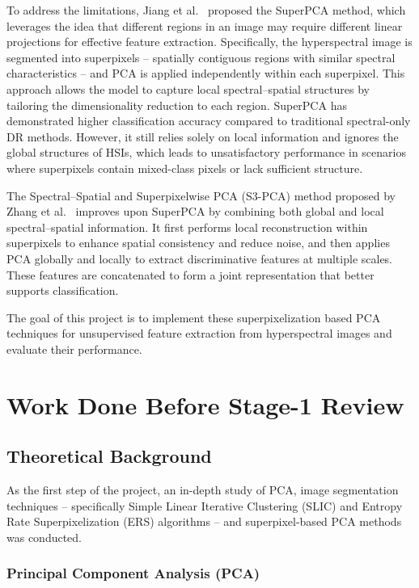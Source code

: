 \documentclass[twoside,english]{article}
\begin{document}
To address the limitations, Jiang et al.\ \citep{SuperPCA} proposed the SuperPCA method, which leverages the idea that different regions in an image may require different linear projections for effective feature extraction. Specifically, the hyperspectral image is segmented into superpixels -- spatially contiguous regions with similar spectral characteristics -- and PCA is applied independently within each superpixel. This approach allows the model to capture local spectral--spatial structures by tailoring the dimensionality reduction to each region. SuperPCA has demonstrated higher classification accuracy compared to traditional spectral-only DR methods. However, it still relies solely on local information and ignores the global structures of HSIs, which leads to unsatisfactory performance in scenarios where superpixels contain mixed-class pixels or lack sufficient structure.


The Spectral–Spatial and Superpixelwise PCA (S3-PCA) method proposed by Zhang et al.\ \citep{S3PCA} improves upon SuperPCA by combining both global and local spectral–spatial information. It first performs local reconstruction within superpixels to enhance spatial consistency and reduce noise, and then applies PCA globally and locally to extract discriminative features at multiple scales. These features are concatenated to form a joint representation that better supports classification.

The goal of this project is to implement these superpixelization based PCA techniques for unsupervised feature extraction from hyperspectral images and evaluate their performance.



\section{Work Done Before Stage-1 Review} \label{sec:stage1}

\subsection{Theoretical Background}
  
As the first step of the project, an in-depth study of PCA, image segmentation techniques -- specifically Simple Linear Iterative Clustering (SLIC) \citep{SLIC} and Entropy Rate Superpixelization (ERS) \citep{ERS} algorithms -- and superpixel-based PCA methods was conducted.
\subsubsection{Principal Component Analysis (PCA)}
\end{document}
